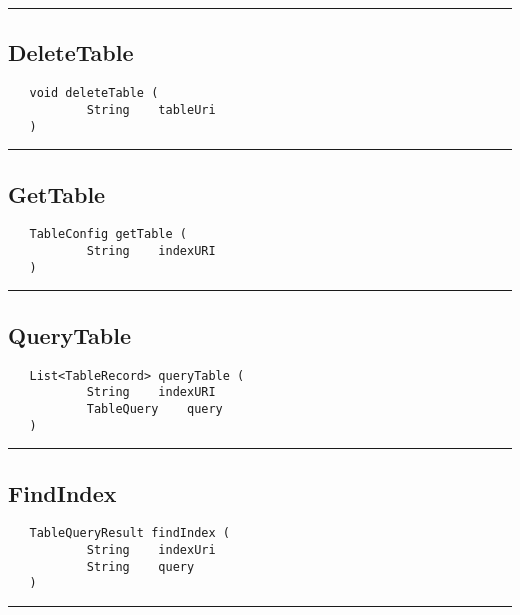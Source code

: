 \rule{15cm}{2pt}
\subsection{DeleteTable}
\label{Api:DeleteTable}
\begin{verbatim}
   void deleteTable (
           String    tableUri
   )
\end{verbatim}



\rule{15cm}{2pt}
\subsection{GetTable}
\label{Api:GetTable}
\begin{verbatim}
   TableConfig getTable (
           String    indexURI
   )
\end{verbatim}



\rule{15cm}{2pt}
\subsection{QueryTable}
\label{Api:QueryTable}
\begin{verbatim}
   List<TableRecord> queryTable (
           String    indexURI
           TableQuery    query
   )
\end{verbatim}



\rule{15cm}{2pt}
\subsection{FindIndex}
\label{Api:FindIndex}
\begin{verbatim}
   TableQueryResult findIndex (
           String    indexUri
           String    query
   )
\end{verbatim}



\rule{15cm}{2pt}
